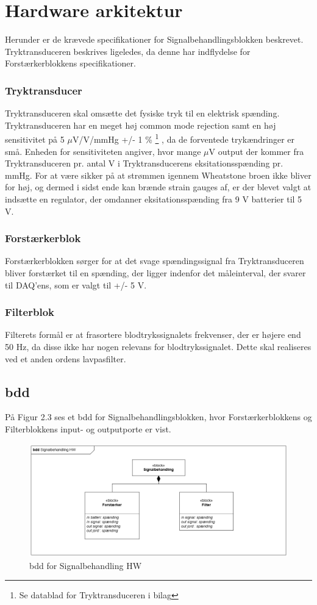\section{Hardware arkitektur}
Herunder er de krævede specifikationer for Signalbehandlingsblokken beskrevet. Tryktransduceren beskrives ligeledes, da denne har indflydelse for Forstærkerblokkens specifikationer. 

\subsubsection{Tryktransducer}
Tryktransduceren skal omsætte det fysiske tryk til en elektrisk spænding. Tryktransduceren har en meget høj common mode rejection samt en høj sensitivitet på 5 $\mu$V/V/mmHg +/- 1 \% \footnote{Se datablad for Tryktransduceren i bilag} , da de forventede trykændringer er små. Enheden for sensitiviteten angiver, hvor mange $\mu$V output der kommer fra Tryktransduceren pr. antal V i Tryktransducerens eksitationsspænding pr. mmHg. For at være sikker på at strømmen igennem Wheatstone broen ikke bliver for høj, og dermed i sidst ende kan brænde strain gauges af, er der blevet valgt at indsætte en regulator, der omdanner eksitationsspænding fra 9 V batterier til 5 V. 

\subsubsection{Forstærkerblok}
Forstærkerblokken sørger for at det svage spændingssignal fra Tryktransduceren bliver forstærket til en spænding, der ligger indenfor det måleinterval, der svarer til DAQ'ens, som er valgt til +/- 5 V.
 
\subsubsection{Filterblok}
Filterets formål er at frasortere blodtrykssignalets frekvenser, der er højere end 50 Hz, da disse ikke har nogen relevans for blodtrykssignalet. Dette skal realiseres ved et anden ordens lavpasfilter. 
 
\subsection{bdd}
På Figur 2.3 ses et bdd for Signalbehandlingsblokken, hvor Forstærkerblokkens og Filterblokkens input- og outputporte er vist.  
\begin{figure}[H]
	\centering
	\includegraphics[width=1\textwidth]{Figurer/4}
	\caption{bdd for Signalbehandling HW}
	\label{fig:bdd hw}
\end{figure}

